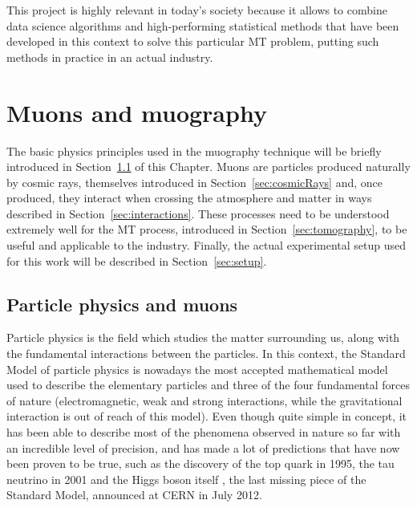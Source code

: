 \documentclass[a4paper, 11pt]{report}
\begin{document}
This project is highly relevant in today's society because it allows to combine data science algorithms and high-performing statistical methods that have been developed in this context to solve this particular MT problem, putting such methods in practice in an actual industry.


























\chapter{Muons and muography}

The basic physics principles used in the muography technique will be briefly introduced in Section~\ref{sec:particlePhysics} of this Chapter. Muons are particles produced naturally by cosmic rays, themselves introduced in Section~\ref{sec:cosmicRays} and, once produced, they interact when crossing the atmosphere and matter in ways described in Section~\ref{sec:interactions}. These processes need to be understood extremely well for the MT process, introduced in Section~\ref{sec:tomography}, to be useful and applicable to the industry. Finally, the actual experimental setup used for this work will be described in Section~\ref{sec:setup}.

\section{Particle physics and muons} \label{sec:particlePhysics}

Particle physics is the field which studies the matter surrounding us, along with the fundamental interactions between the particles. In this context, the Standard Model of particle physics \cite{SM} is nowadays the most accepted mathematical model used to describe the elementary particles and three of the four fundamental forces of nature (electromagnetic, weak and strong interactions, while the gravitational interaction is out of reach of this model). Even though quite simple in concept, it has been able to describe most of the phenomena observed in nature so far with an incredible level of precision, and has made a lot of predictions that have now been proven to be true, such as the discovery of the top quark \cite{topQuark} in 1995, the tau neutrino \cite{tauNeutrino} in 2001 and the Higgs boson itself \cite{HiggsDiscovery1, HiggsDiscovery2}, the last missing piece of the Standard Model, announced at CERN in July 2012.
\end{document}

